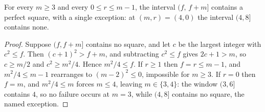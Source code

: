 \begin{lemma}\label{lem:window-square}
For every $m \ge 3$ and every $0 \le r \le m-1$, the interval
$(f,\, f+m]$ contains a perfect square, with a single exception: at
$(m, r) = (4, 0)$ the interval $(4, 8]$ contains none.
\end{lemma}
\begin{proof}
Suppose $(f, f+m]$ contains no square, and let $c$ be the largest integer
with $c^2 \le f$. Then $(c+1)^2 > f + m$, and subtracting $c^2 \le f$
gives $2c + 1 > m$, so $c \ge m/2$ and $c^2 \ge m^2/4$. Hence
$m^2/4 \le f$. If $r \ge 1$ then $f = r \le m-1$, and $m^2/4 \le m-1$
rearranges to $(m-2)^2 \le 0$, impossible for $m \ge 3$. If $r = 0$ then
$f = m$, and $m^2/4 \le m$ forces $m \le 4$, leaving $m \in \{3, 4\}$:
the window $(3, 6]$ contains $4$, so no failure occurs at $m = 3$, while
$(4, 8]$ contains no square, the named exception.
\end{proof}

